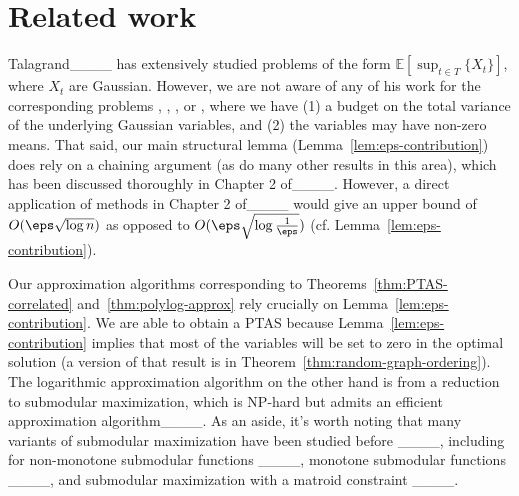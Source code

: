 \section{Related work}
\label{sbs:related}
Talagrand____ has extensively studied problems of the form $\mathbb{E}[\sup_{t\in T}\{X_t\}]$, where $X_t$ are Gaussian. However, we are not aware of any of his work for the corresponding problems \basic, \gena, \genb, or \genbcorr, where we have (1) a budget on the total variance of the underlying Gaussian variables, and (2) the variables may have non-zero means. That said, our main structural lemma (Lemma~\ref{lem:eps-contribution}) does rely on a chaining argument (as do many other results in this area), which has been discussed thoroughly in Chapter 2 of____. However, a direct application of methods in Chapter 2 of____ would give an upper bound of $O(\eps\sqrt{\log n})$ as opposed to $O(\eps\sqrt{\log \frac{1}{\eps}})$ (cf. Lemma~\ref{lem:eps-contribution}).


Our approximation algorithms corresponding to Theorems~\ref{thm:PTAS-correlated} and~\ref{thm:polylog-approx} rely crucially on Lemma~\ref{lem:eps-contribution}. We are able to obtain a PTAS because Lemma~\ref{lem:eps-contribution} implies that most of the variables will be set to zero in the optimal solution (a version of that result is in Theorem~\ref{thm:random-graph-ordering}). The logarithmic approximation algorithm on the other hand is from a reduction to submodular maximization, which is NP-hard but admits an efficient approximation algorithm____. 
As an aside, it's worth noting that many variants of submodular maximization have been studied before ____, including for non-monotone submodular functions ____, monotone submodular functions ____, and submodular maximization with a matroid constraint ____.